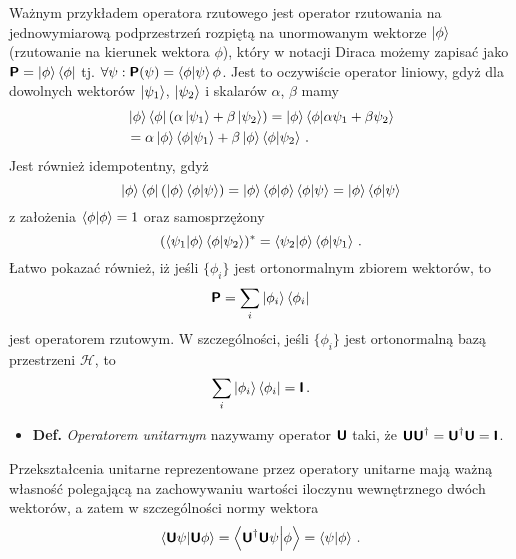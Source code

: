 \documentclass{myclass}
\begin{document}
Ważnym przykładem operatora rzutowego jest operator rzutowania na jednowymiarową podprzestrzeń
rozpiętą na unormowanym wektorze \(\ket{\phi}\) (rzutowanie na kierunek wektora \(\phi\)), który w
notacji Diraca możemy zapisać jako \(\boldsymbol{\mathsf{P}} = \ket{\phi}\bra{\phi}\) tj. \(\forall \psi :
\boldsymbol{\mathsf{P}}(\psi) = \braket{\phi}{\psi}\phi\). Jest to oczywiście operator liniowy, gdyż dla dowolnych
wektorów \(\ket{\psi_1}\), \(\ket{\psi_2}\) i skalarów \(\alpha\), \(\beta\) mamy
\begin{equation*}
    \begin{split}
        &\ket{\phi}\bra{\phi}(\alpha\ket{\psi_1} + \beta\ket{\psi_2}) = \ket{\phi}\braket{\phi}{\alpha\psi_1 + \beta\psi_2} \\
        &= \alpha\ket{\phi} \braket{\phi}{\psi_1} + \beta\ket{\phi}\braket{\phi}{\psi_2}\,.
    \end{split}
\end{equation*}
Jest również idempotentny, gdyż 
\begin{equation*}
    \ket{\phi}\bra{\phi}(\ket{\phi}\braket{\phi}{\psi}) = \ket{\phi}\braket{\phi}\braket{\phi}{\psi} = \ket{\phi}\braket{\phi}{\psi}
\end{equation*}
z założenia \(\braket{\phi} = 1\) oraz samosprzężony
\begin{equation*}
    (\braket{\psi_1}{\phi}\braket{\phi}{\psi_2})^* = \braket{\psi_2}{\phi}\braket{\phi}{\psi_1}\,.
\end{equation*}
Łatwo pokazać również, iż jeśli \(\{\phi_i\}\) jest ortonormalnym zbiorem wektorów, to
\begin{equation*}
    \boldsymbol{\mathsf{P}} = \sum_i \ket{\phi_i}\bra{\phi_i}
\end{equation*}
jest operatorem rzutowym. W szczególności, jeśli \(\{\phi_i\}\) jest ortonormalną bazą przestrzeni
\(\mathscr{H}\), to
\begin{equation*}
    \sum_i \ket{\phi_i}\bra{\phi_i} = \boldsymbol{\mathsf{I}}\,.
\end{equation*}

\begin{itemize}
    
    \item \textbf{Def.} \textit{Operatorem unitarnym} nazywamy operator \(\boldsymbol{\mathsf{U}}\) taki, że
    \(\boldsymbol{\mathsf{U}}\boldsymbol{\mathsf{U}}^\dagger = \boldsymbol{\mathsf{U}}^\dagger\boldsymbol{\mathsf{U}} = \boldsymbol{\mathsf{I}}\).

\end{itemize}

Przekształcenia unitarne reprezentowane przez operatory unitarne mają ważną własność polegającą na
zachowywaniu wartości iloczynu wewnętrznego dwóch wektorów, a zatem w szczególności normy wektora
\begin{equation*}
    \braket{\boldsymbol{\mathsf{U}}\psi}{\boldsymbol{\mathsf{U}}\phi} = \braket{\boldsymbol{\mathsf{U}}^\dagger\boldsymbol{\mathsf{U}}\psi}{\phi} = \braket{\psi}{\phi}\,.
\end{equation*}
    
\end{document}

